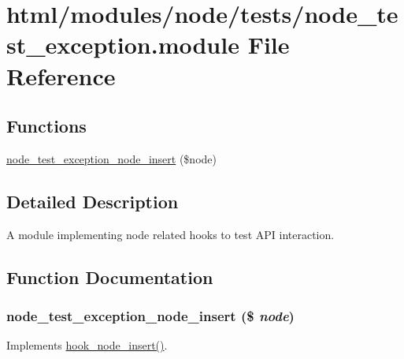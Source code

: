 \hypertarget{node__test__exception_8module}{
\section{html/modules/node/tests/node\_\-test\_\-exception.module File Reference}
\label{node__test__exception_8module}
}
\subsection*{Functions}
\begin{DoxyCompactItemize}
\item 
\hyperlink{node__test__exception_8module_a55c7d6abea3ce6766328f7325a2dc8ff}{node\_\-test\_\-exception\_\-node\_\-insert} (\$node)
\end{DoxyCompactItemize}


\subsection{Detailed Description}
A module implementing node related hooks to test API interaction. 

\subsection{Function Documentation}
\hypertarget{node__test__exception_8module_a55c7d6abea3ce6766328f7325a2dc8ff}{
\subsubsection[{node\_\-test\_\-exception\_\-node\_\-insert}]{\setlength{\rightskip}{0pt plus 5cm}node\_\-test\_\-exception\_\-node\_\-insert (\$ {\em node})}}
\label{node__test__exception_8module_a55c7d6abea3ce6766328f7325a2dc8ff}
Implements \hyperlink{group__node__api__hooks_ga8b40dc62e46e5055c205d2a723dc3548}{hook\_\-node\_\-insert()}. 